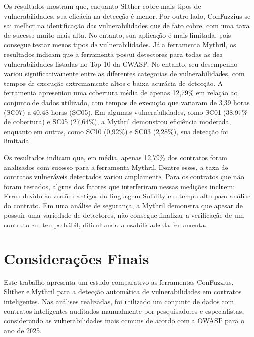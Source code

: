 \documentclass[12pt]{article}
\begin{document}
Os resultados mostram que, enquanto Slither cobre mais tipos de vulnerabilidades, sua eficácia na detecção é menor. Por outro lado, ConFuzzius se sai melhor na identificação das vulnerabilidades que de fato cobre, com uma taxa de sucesso muito mais alta. No entanto, sua aplicação é mais limitada, pois consegue testar menos tipos de vulnerabilidades. Já a ferramenta Mythril, os resultados indicam que a ferramenta possui detectores para todas as dez vulnerabilidades listadas no Top 10 da OWASP. No entanto, seu desempenho variou significativamente entre as diferentes categorias de vulnerabilidades, com tempos de execução extremamente altos e baixa acurácia de detecção. A ferramenta apresentou uma cobertura média de apenas 12,79\% em relação ao conjunto de dados utilizado, com tempos de execução que variaram de 3,39 horas (SC07) a 40,48 horas (SC05). Em algumas vulnerabilidades, como SC01 (38,97\% de cobertura) e SC05 (27,64\%), a Mythril demonstrou eficiência moderada, enquanto em outras, como SC10 (0,92\%) e SC03 (2,28\%), sua detecção foi limitada.

Os resultados indicam que, em média, apenas 12,79\% dos contratos foram analisados com sucesso para a ferramenta Mythril. Dentre esses, a taxa de contratos vulneráveis detectados variou amplamente. Para os contratos que não foram testados, alguns dos fatores que interferiram nessas medições incluem: Erros devido às versões antigas da linguagem Solidity e o tempo alto para análise do contrato. Em uma análise de segurança, a Mythril demonstra que apesar de possuir uma variedade de detectores, não consegue finalizar a verificação de um contrato em tempo hábil, dificultando a usabilidade da ferramenta.

\section{Considerações Finais}\label{sec:conclusion}

Este trabalho apresenta um estudo comparativo as ferramentas ConFuzzius, Slither e Mythril para a detecção automática de vulnerabilidades em contratos inteligentes. Nas análises realizadas, foi utilizado um conjunto de dados com contratos inteligentes auditados manualmente por pesquisadores e especialistas, considerando as vulnerabilidades mais comuns de acordo com a OWASP para o ano de 2025.
\end{document}
